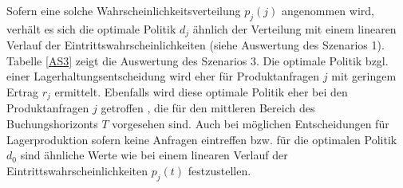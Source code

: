 Sofern eine solche Wahrscheinlichkeitsverteilung $p_j(j)$ angenommen wird, verhält es sich die optimale Politik $d_j$ ähnlich der Verteilung mit einem linearen Verlauf der Eintrittswahrscheinlichkeiten (siehe Auswertung des Szenarios 1). Tabelle \ref{AS3} zeigt die Auswertung des Szenarios 3. Die optimale Politik bzgl. einer Lagerhaltungsentscheidung wird eher für Produktanfragen $j$ mit geringem Ertrag $r_j$ ermittelt. Ebenfalls wird diese optimale Politik eher bei den Produktanfragen $j$ getroffen , die für den mittleren Bereich des Buchungshorizonts $T$ vorgesehen sind. Auch bei möglichen Entscheidungen für Lagerproduktion sofern keine Anfragen eintreffen bzw. für die optimalen Politik $d_0$ sind ähnliche Werte wie bei einem linearen Verlauf der Eintrittswahrscheinlichkeiten $p_j(t)$ festzustellen.\\[30mm]
\newpage

